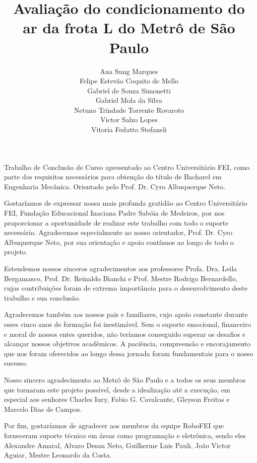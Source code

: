 \documentclass[acronym,symbols,table]{fei}
\title{Avaliação do condicionamento do ar da frota L do Metrô de São Paulo}
\author{Ana Sung Marques \\Felipe Estevão Coquito de Mello\\  Gabriel de Souza Simonetti  \\ Gabriel Mola da Silva \\ Netuno Trindade Torrente Rovaroto \\ Victor Salzo Lopes  \\ Vitoria Fedatto Stefaneli}
\begin{document}
\maketitle

\begin{folhaderosto}
	Trabalho de Conclusão de Curso apresentado ao Centro Universitário FEI, como parte dos requisitos necessários para obtenção do título de Bacharel em Engenharia Mecânica. Orientado pelo Prof. Dr. Cyro Albuquerque Neto.
\end{folhaderosto}

\begin{agradecimentos}

Gostaríamos de expressar nossa mais profunda gratidão ao Centro Universitário FEI, Fundação Educacional Inaciana Padre Sabóia de Medeiros, por nos proporcionar a oportunidade de realizar este trabalho com todo o suporte necessário. Agradecemos especialmente ao nosso orientador, Prof. Dr. Cyro Albuquerque Neto, por sua orientação e apoio contínuos ao longo de todo o projeto.

Estendemos nossos sinceros agradecimentos aos professores Profa. Dra. Leila Bergamasco, Prof. Dr. Reinaldo Bianchi e Prof. Mestre Rodrigo Bernardello, cujas contribuições foram de extrema importância para o desenvolvimento deste trabalho e sua conclusão.

Agradecemos também aos nossos pais e familiares, cujo apoio constante durante esses cinco anos de formação foi inestimável. Sem o suporte emocional, financeiro e moral de nossos entes queridos, não teríamos conseguido superar os desafios e alcançar nossos objetivos acadêmicos. A paciência, compreensão e encorajamento que nos foram oferecidos ao longo dessa jornada foram fundamentais para o nosso sucesso.

Nosso sincero agradecimento ao Metrô de São Paulo e a todos os seus membros que tornaram este projeto possível, desde a idealização até a execução, em especial aos senhores Charles Iury, Fabio G. Cavalcante, Gleyson Freitas e Marcelo Dias de Campos. 

Por fim, gostaríamos de agradecer aos membros da equipe RoboFEI que forneceram suporte técnico em áreas como programação e eletrônica, sendo eles Alexandre Amaral, Alvaro Desan Neto, Guilherme Luis Pauli, João Victor Aguiar, Mestre Leonardo da Costa.

\end{agradecimentos}
\end{document}
